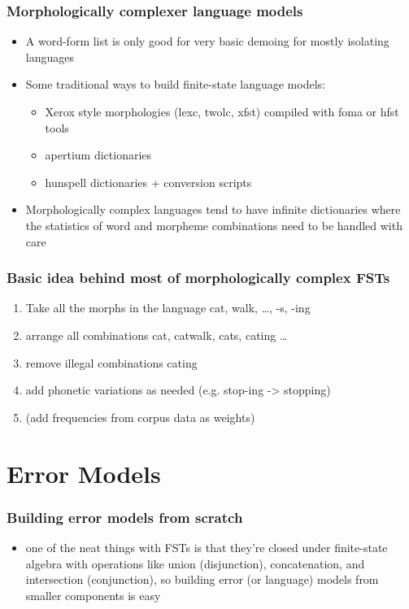 \documentclass{beamer}
\begin{document}
\begin{frame}
    \frametitle{Morphologically complexer language models}
    \begin{itemize}
        \item A word-form list is only good for very basic demoing for mostly
            isolating languages
        \item Some traditional ways to build finite-state language models:
            \begin{itemize}
                \item Xerox style morphologies (lexc, twolc, xfst)
                    compiled with foma or hfst tools
                \item apertium dictionaries
                \item hunspell dictionaries + conversion scripts
            \end{itemize}
        \item Morphologically complex languages tend to have infinite
            dictionaries where the statistics of word and morpheme combinations
            need to be handled with care
    \end{itemize}
\end{frame}

\begin{frame}
    \frametitle{Basic idea behind most of morphologically complex FSTs}
    \begin{enumerate}
        \item Take all the morphs in the language {cat, walk, \ldots, -s, -ing}
        \item arrange all combinations {cat, catwalk, cats, cating \ldots}
        \item remove illegal combinations {\alert{cating}}
        \item add phonetic variations as needed (e.g. stop-ing -> stopping)
        \item (add frequencies from corpus data as weights)
    \end{enumerate}
\end{frame}


\section{Error Models}

\begin{frame}
   \frametitle{Building error models from scratch}
   \begin{itemize}
       \item one of the neat things with FSTs is that they're closed
           under finite-state algebra with operations like union (disjunction),
           concatenation, and intersection (conjunction), so building error
           (or language) models from smaller components is easy
   \end{itemize}
\end{frame}
\end{document}
